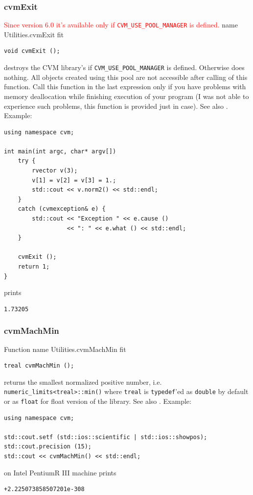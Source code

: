 \subsubsection{cvmExit}
\textcolor{red}{Since version 6.0 it's available only if \texttt{CVM\_USE\_POOL\_MANAGER} is defined.}%
\pdfdest name {Utilities.cvmExit} fit
\begin{verbatim}
void cvmExit ();
\end{verbatim}
destroys the CVM library's 
if \verb"CVM_USE_POOL_MANAGER" is defined. Otherwise does nothing.
All objects created using this pool are not accessible
after calling of this function.
Call this function in the last expression only
if you have problems with memory deallocation
while finishing execution of your program
(I was not able to experience such problems,
this function is provided just in case).
See also .
Example:
\begin{Verbatim}
using namespace cvm;

int main(int argc, char* argv[])
    try {
        rvector v(3);
        v[1] = v[2] = v[3] = 1.;
        std::cout << v.norm2() << std::endl;
    }
    catch (cvmexception& e) {
        std::cout << "Exception " << e.cause ()
                  << ": " << e.what () << std::endl;
    }

    cvmExit ();
    return 1;
}
\end{Verbatim}
prints
\begin{Verbatim}
1.73205
\end{Verbatim}
\newpage




\subsubsection{cvmMachMin}
Function%
\pdfdest name {Utilities.cvmMachMin} fit
\begin{verbatim}
treal cvmMachMin ();
\end{verbatim}
returns the smallest normalized positive number,
i.e. \verb"numeric_limits<treal>::min()"
where \verb"treal" is \verb"typedef"'ed as \verb"double"
by default or as \verb"float" for float version of the library.
See also .
Example:
\begin{Verbatim}
using namespace cvm;

std::cout.setf (std::ios::scientific | std::ios::showpos);
std::cout.precision (15);
std::cout << cvmMachMin() << std::endl;
\end{Verbatim}
on Intel Pentium\textcircled{\scriptsize{R}} III machine prints
\begin{Verbatim}
+2.225073858507201e-308
\end{Verbatim}
\newpage




